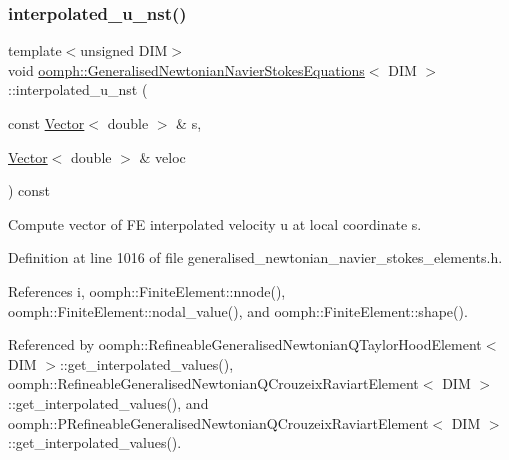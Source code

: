 \subsubsection{\texorpdfstring{interpolated\+\_\+u\+\_\+nst()}{interpolated\_u\_nst()}\hspace{0.1cm}{\footnotesize\ttfamily [1/3]}}
{\footnotesize\ttfamily template$<$unsigned D\+IM$>$ \\
void \hyperlink{classoomph_1_1GeneralisedNewtonianNavierStokesEquations}{oomph\+::\+Generalised\+Newtonian\+Navier\+Stokes\+Equations}$<$ D\+IM $>$\+::interpolated\+\_\+u\+\_\+nst (\begin{DoxyParamCaption}\item[{const \hyperlink{classoomph_1_1Vector}{Vector}$<$ double $>$ \&}]{s,  }\item[{\hyperlink{classoomph_1_1Vector}{Vector}$<$ double $>$ \&}]{veloc }\end{DoxyParamCaption}) const\hspace{0.3cm}{\ttfamily [inline]}}



Compute vector of FE interpolated velocity u at local coordinate s. 



Definition at line 1016 of file generalised\+\_\+newtonian\+\_\+navier\+\_\+stokes\+\_\+elements.\+h.



References i, oomph\+::\+Finite\+Element\+::nnode(), oomph\+::\+Finite\+Element\+::nodal\+\_\+value(), and oomph\+::\+Finite\+Element\+::shape().



Referenced by oomph\+::\+Refineable\+Generalised\+Newtonian\+Q\+Taylor\+Hood\+Element$<$ D\+I\+M $>$\+::get\+\_\+interpolated\+\_\+values(), oomph\+::\+Refineable\+Generalised\+Newtonian\+Q\+Crouzeix\+Raviart\+Element$<$ D\+I\+M $>$\+::get\+\_\+interpolated\+\_\+values(), and oomph\+::\+P\+Refineable\+Generalised\+Newtonian\+Q\+Crouzeix\+Raviart\+Element$<$ D\+I\+M $>$\+::get\+\_\+interpolated\+\_\+values().

\mbox{\label{classoomph_1_1GeneralisedNewtonianNavierStokesEquations_aa5de92e38d9f173c011020b65e425516}} 
